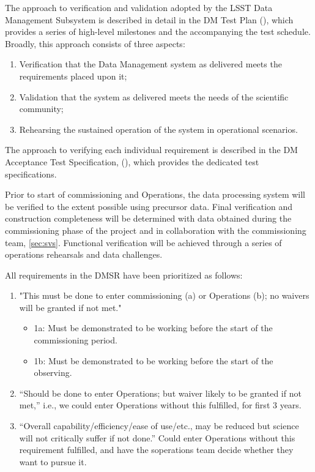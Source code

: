 The approach to verification and validation adopted by the LSST Data Management Subsystem is described in detail in the DM Test Plan (), which provides a series of high-level milestones and the accompanying the test schedule.
Broadly, this approach consists of three aspects:
\begin{enumerate}
	\item Verification that the Data Management system as delivered meets the requirements placed upon it;
	\item Validation that the system as delivered meets the needs of the scientific community;
	\item Rehearsing the sustained operation of the system in operational scenarios.
\end{enumerate}
The approach to verifying each individual requirement is described in the DM Acceptance Test Specification, (), which provides the dedicated test specifications.

Prior to start of commissioning and Operations, the data processing system will be verified to the extent possible using precursor data.
Final verification and construction completeness will be determined with data obtained during the commissioning phase of the project and in collaboration with the commissioning team, \ref{sec:svs}.
Functional verification will be achieved through a series of operations rehearsals and data challenges.

All requirements in the DMSR have been prioritized as follows:
\begin{enumerate}
	\item "This must be done to enter commissioning (a) or Operations (b); no waivers will be granted if not met."
		\begin{itemize}
			\item 1a: Must be demonstrated to be working before the start of the commissioning period.
			\item 1b: Must be demonstrated to be working before the start of the observing.
		\end{itemize}
	\item  ``Should be done to enter Operations; but waiver likely to be granted if not met,'' i.e., we could enter Operations without this fulfilled, for first 3 years.
	\item  ``Overall capability/efficiency/ease of use/etc., may be reduced but science will not critically suffer if not done.'' Could enter Operations without this requirement fulfilled, and have the soperations team decide whether they want to pursue it.
\end{enumerate}

